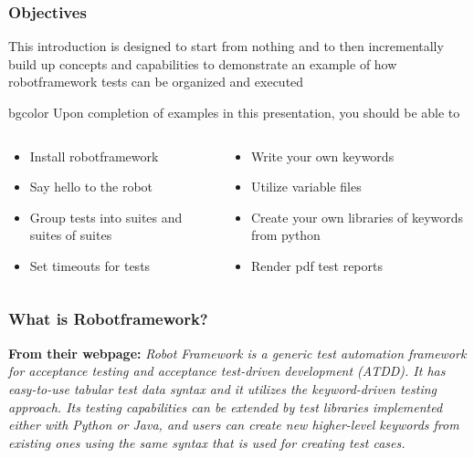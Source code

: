 \documentclass[xcolor=table,handout]{beamer}
\begin{document}
\begin{frame}\frametitle{Objectives}
    This introduction is designed to start from nothing and to then incrementally build up concepts and capabilities to demonstrate an example of how robotframework tests can be organized and executed

\vfill

     \begin{beamercolorbox}[rounded=true, center, shadow=true,wd=\textwidth]{bgcolor}
    \footnotesize Upon completion of examples in this presentation, you should be able to
     \end{beamercolorbox}
    \begin{columns}
        \begin{column}[T]{0.50\textwidth}
    \begin{itemize}
        \item Install robotframework
        \item Say hello to the robot
        \item Group tests into suites and suites of suites
        \item Set timeouts for tests
    \end{itemize}
        \end{column}
        \begin{column}[T]{0.50\textwidth}
    \begin{itemize}
        \item Write your own keywords
        \item Utilize variable files
        \item Create your own libraries of keywords from python
        \item Render pdf test reports
    \end{itemize}
        \end{column}
    \end{columns}
\end{frame}

\begin{frame}\frametitle{What is Robotframework?}
\vfill
\textbf{From their webpage:}
\vfill
    \emph{Robot Framework is a generic test automation framework for acceptance testing and acceptance test-driven development (ATDD). It has easy-to-use tabular test data syntax and it utilizes the keyword-driven testing approach. Its testing capabilities can be extended by test libraries implemented either with Python or Java, and users can create new higher-level keywords from existing ones using the same syntax that is used for creating test cases.}
\vfill
\end{frame}
\end{document}
